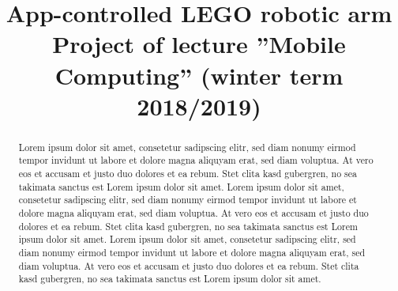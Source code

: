 \documentclass[conference]{IEEEtran}
\begin{document}
\title{App-controlled LEGO robotic arm\\
{\footnotesize Project of lecture ''Mobile Computing'' (winter term 2018/2019)}
}

\author{
\and
{}
}

\maketitle

\begin{abstract}
Lorem ipsum dolor sit amet, consetetur sadipscing elitr, sed diam nonumy eirmod tempor invidunt ut labore et dolore magna aliquyam erat, sed diam voluptua. At vero eos et accusam et justo duo dolores et ea rebum. Stet clita kasd gubergren, no sea takimata sanctus est Lorem ipsum dolor sit amet. Lorem ipsum dolor sit amet, consetetur sadipscing elitr, sed diam nonumy eirmod tempor invidunt ut labore et dolore magna aliquyam erat, sed diam voluptua. At vero eos et accusam et justo duo dolores et ea rebum. Stet clita kasd gubergren, no sea takimata sanctus est Lorem ipsum dolor sit amet. Lorem ipsum dolor sit amet, consetetur sadipscing elitr, sed diam nonumy eirmod tempor invidunt ut labore et dolore magna aliquyam erat, sed diam voluptua. At vero eos et accusam et justo duo dolores et ea rebum. Stet clita kasd gubergren, no sea takimata sanctus est Lorem ipsum dolor sit amet.
\end{abstract}

\end{document}
